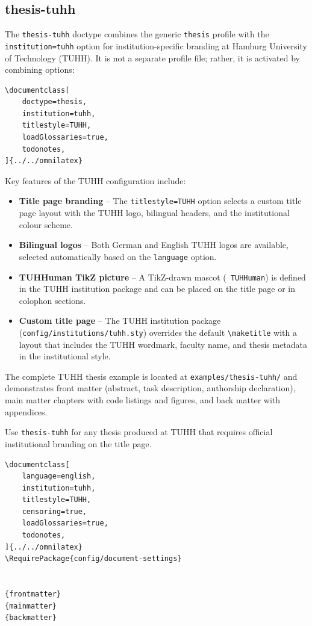 \subsection{thesis-tuhh}

The \texttt{thesis-tuhh} doctype combines the generic \texttt{thesis} profile
with the \texttt{institution=tuhh} option for institution-specific branding
at Hamburg University of Technology (TUHH).  It is not a separate profile
file; rather, it is activated by combining options:

\begin{verbatim}
\documentclass[
    doctype=thesis,
    institution=tuhh,
    titlestyle=TUHH,
    loadGlossaries=true,
    todonotes,
]{../../omnilatex}
\end{verbatim}

Key features of the TUHH configuration include:

\begin{itemize}
    \item \textbf{Title page branding} -- The \texttt{titlestyle=TUHH}
          option selects a custom title page layout with the TUHH logo,
          bilingual headers, and the institutional colour scheme.
    \item \textbf{Bilingual logos} -- Both German and English TUHH logos
          are available, selected automatically based on the
          \texttt{language} option.
    \item \textbf{TUHHuman TikZ picture} -- A TikZ-drawn mascot
          (\texttt{ TUHHuman}) is defined in the TUHH institution package
          and can be placed on the title page or in colophon sections.
    \item \textbf{Custom title page} -- The TUHH institution package
          (\texttt{config/institutions/tuhh.sty}) overrides the default
          \texttt{\textbackslash maketitle} with a layout that includes the
          TUHH wordmark, faculty name, and thesis metadata in the
          institutional style.
\end{itemize}

The complete TUHH thesis example is located at
\texttt{examples/thesis-tuhh/} and demonstrates front matter (abstract,
task description, authorship declaration), main matter chapters with code
listings and figures, and back matter with appendices.

Use \texttt{thesis-tuhh} for any thesis produced at TUHH that requires
official institutional branding on the title page.

\begin{verbatim}
\documentclass[
    language=english,
    institution=tuhh,
    titlestyle=TUHH,
    censoring=true,
    loadGlossaries=true,
    todonotes,
]{../../omnilatex}
\RequirePackage{config/document-settings}


{frontmatter}
{mainmatter}
{backmatter}

\end{verbatim}

